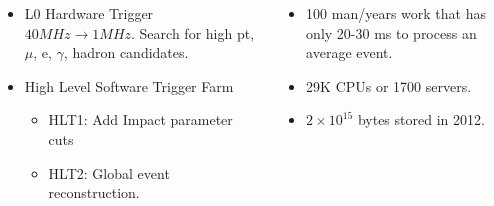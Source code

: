 \documentclass{beamer}
\begin{document}
\begin{frame}
\begin{columns}[c]
\begin{itemize}
  \item L0 Hardware Trigger $40 MHz \rightarrow 1 MHz$. Search for high pt, $\mu$, e, $\gamma$, hadron candidates.
  \item High Level Software Trigger Farm
  \begin{itemize}
    \item HLT1: Add Impact parameter cuts
    \item HLT2: Global event reconstruction.
  \end{itemize}
\end{itemize}
\begin{itemize}
  \item 100 man/years work that has only 20-30 ms to process an average event.
  \item 29K CPUs or 1700 servers.
  \item $2 \times 10^{15}$ bytes stored in 2012.
\end{itemize}
\end{columns}
\end{frame}
\end{document}
